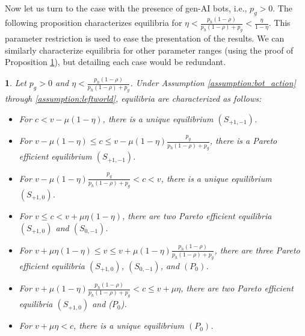 \documentclass[english,12pt]{article}
\theoremstyle{plain}
\theoremstyle{plain}
\theoremstyle{definition}
\theoremstyle{definition}
\theoremstyle{assumption}
\theoremstyle{plain}
\theoremstyle{plain}
\theoremstyle{plain}
\newtheorem{proposition}{\protect\propositionname}
\theoremstyle{plain}
\theoremstyle{definition}%
\theoremstyle{plain}
\theoremstyle{plain}
\theoremstyle{plain}
\theoremstyle{plain}
\theoremstyle{plain}
\theoremstyle{plain}
\providecommand{\propositionname}{Proposition}
\begin{document}
Now let us turn to the case with the presence of gen-AI bots, i.e., $p_g>0$. The following proposition characterizes equilibria for $\eta<\frac{p_h(1-\rho)}{p_h(1-\rho)+p_g}<\frac{\eta}{1-\eta}$. This parameter restriction is used to ease the presentation of the results. We can similarly characterize equilibria for other parameter ranges (using the proof of Proposition \ref{prop:withAI}), but detailing each case would be redundant.


\begin{proposition}\label{prop:withAI}
    Let $p_g>0$ and $\eta<\frac{p_h(1-\rho)}{p_h(1-\rho)+p_g}$. Under Assumption \ref{assumption:bot_action} through \ref{assumption:leftworld}, equilibria are characterized as follows:
    \begin{itemize}
        \item[(i)] For $c<v-\mu(1-\eta)$, there is a unique equilibrium $(S_{+1,-1})$.
        \item[(ii)] For $v-\mu(1-\eta)\leq c\leq v-\mu(1-\eta)\frac{p_g}{p_h(1-\rho)+p_g}$, there is a Pareto efficient equilibrium $(S_{+1,-1})$.
        \item[(iii)] For $v-\mu(1-\eta)\frac{p_g}{p_h(1-\rho)+p_g}<c<v$, there is a unique equilibrium $(S_{+1,0})$.
        \item[(iv)] For $v\leq c<v+\mu\eta(1-\eta)$, there are two Pareto efficient equilibria $(S_{+1,0})$ and $(S_{0,-1})$.
        \item[(v)] For $v+\mu\eta(1-\eta)\leq v\leq v+\mu(1-\eta)\frac{p_h(1-\rho)}{p_h(1-\rho)+p_g}$, there are three Pareto efficient equilibria $(S_{+1,0})$, $(S_{0,-1})$, and $(P_0)$.
        \item[(vi)] For $v+\mu(1-\eta)\frac{p_h(1-\rho)}{p_h(1-\rho)+p_g}<c\leq v+\mu\eta$, there are two Pareto efficient equilibria $(S_{+1,0})$ and ($P_0$).
        \item[(vii)] For $v+\mu\eta<c$, there is a unique equilibrium $(P_0)$.
    \end{itemize}
\end{proposition}
\end{document}

